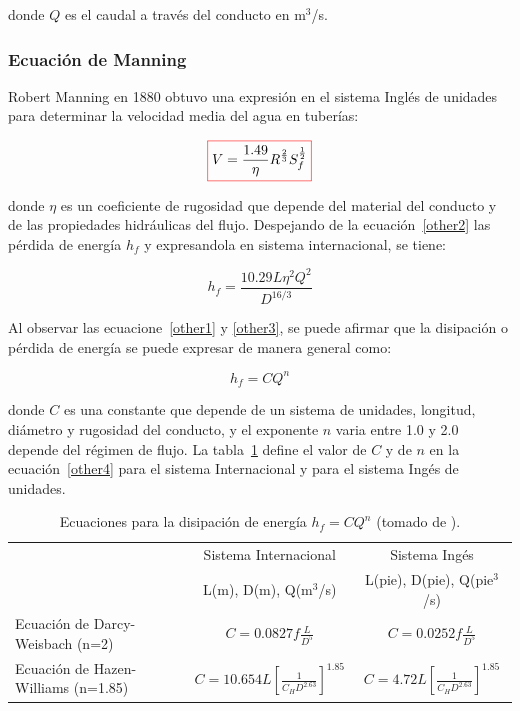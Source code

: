 \documentclass[11pt, oneside]{article}
\begin{document}
donde $Q$ es el caudal a trav\'es del conducto en m$^3$/s.

\subsubsection*{Ecuaci\'on de Manning}
Robert Manning en 1880 obtuvo una expresi\'on en el sistema Ingl\'es de unidades para determinar la velocidad media del agua en tuber\'ias:

\begin{equation}
\color{red}\boxed{\color{black} V = \frac{1.49}{\eta} R^{\frac{2}{3}} S_f^{\frac{1}{2}} }
\label{other2}
\end{equation}

donde $\eta$ es un coeficiente de rugosidad que depende del material del conducto y de las propiedades hidr\'aulicas del flujo. Despejando de la ecuaci\'on~\ref{other2} las p\'erdida de energ\'ia $h_f$ y expresandola en sistema internacional, se tiene:

\begin{equation}
h_f = \frac{10.29 L \eta^2 Q^2}{D^{16/3}}
\label{other3}
\end{equation}

Al observar las ecuacione~\ref{other1} y \ref{other3}, se puede afirmar que la disipaci\'on o p\'erdida de energ\'ia se puede expresar de manera general como:

\begin{equation}
h_f = C Q^n
\label{other4}
\end{equation}

donde $C$ es una constante que depende de un sistema de unidades, longitud, di\'ametro y rugosidad del conducto, y el exponente $n$ varia entre 1.0 y 2.0 depende del r\'egimen de flujo. La tabla~\ref{tper} define el valor de $C$  y de $n$ en la ecuaci\'on~\ref{other4} para el sistema Internacional y para el sistema Ing\'es de unidades. 

\begin{table}[h!]
\centering
\begin{tabular}{l c c}
 \hline
 & Sistema Internacional & Sistema Ing\'es \\ [0.5ex]
 & L(m), D(m), Q(m$^3$/s) & L(pie), D(pie), Q(pie$^3$/s) \\ [0.5ex]
 \hline\hline
Ecuaci\'on de Darcy-Weisbach (n=2) & $C=0.0827 f\frac{L}{D^5}$ &  $C=0.0252 f\frac{L}{D^5}$\\
Ecuaci\'on de Hazen-Williams (n=1.85) & $C=10.654 L \left[ \frac{1}{C_H D^{2.63}}\right]^{1.85}$ &  $C=4.72 L \left[ \frac{1}{C_H D^{2.63}}\right]^{1.85}$ \\
\hline
\end{tabular}
\caption{Ecuaciones para la disipaci\'on de energ\'ia $h_f = C Q^n$ (tomado de \cite{agudelo2011mecanica}).}
\label{tper}
\end{table}
\end{document}
